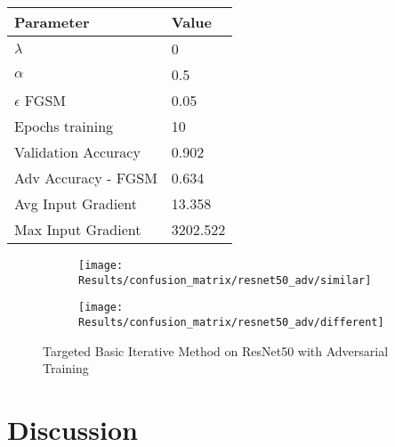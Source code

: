\documentclass[draft,final]{vutinfth} %
\begin{document}
\begin{table}[h]
  \centering
  \begin{tabular}{ll}
    \toprule
			Parameter			& Value   \\
    \midrule
			$\lambda$								& 0				\\
			$\alpha$								& 0.5				\\
			$\epsilon$ FGSM					& 0.05		\\
			Epochs training					& 10			\\
			
			Validation Accuracy			& 0.902		\\ 
			Adv Accuracy - FGSM			& 0.634		\\
			
			Avg Input Gradient			& 13.358	\\
			Max Input Gradient			& 3202.522\\
    \bottomrule
  \end{tabular}
\end{table}


\begin{figure}[h]
  \begin{subfigure}[b]{0.5\columnwidth}
		\centering
    \texttt{[image: Results/confusion\_matrix/resnet50\_adv/similar]}
    \label{fig:exp:cm:resnet50_gradreg_adv:similar}
  \end{subfigure}
  \begin{subfigure}[b]{0.5\columnwidth}
		\centering
    \texttt{[image: Results/confusion\_matrix/resnet50\_adv/different]}
    \label{fig:exp:cm:resnet50_adv:different}
  \end{subfigure}
  \caption{Targeted Basic Iterative Method on ResNet50 with Adversarial Training}
  \label{fig:exp:cm:resnet50_adv}
\end{figure}

\clearpage

\section{Discussion}
\end{document}
